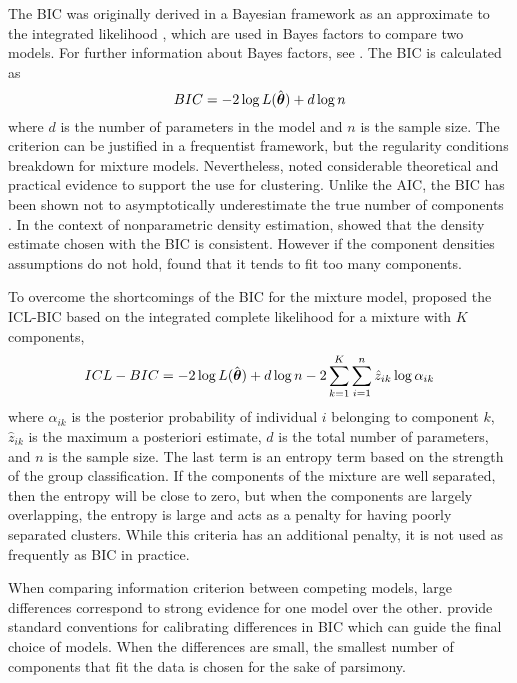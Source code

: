 The BIC was originally derived in a Bayesian framework as an approximate to the integrated likelihood  \cite{schwarz1978}, which are used in Bayes factors to compare two models. For further information about Bayes factors, see \textcite{kass1995}. The BIC is calculated as
$$BIC= -2 \log L(\hat{\boldsymbol\theta}) + d\log n $$
where $d$ is the number of parameters in the model and $n$ is the sample size. The criterion can be justified in a frequentist framework, but the regularity conditions breakdown for mixture models. Nevertheless, \textcite{fraley1998} noted considerable theoretical and practical evidence to support the use for clustering. Unlike the AIC, the BIC has been shown not to asymptotically underestimate the true number of components \cite{leroux1992}. In the context of nonparametric density estimation,  \textcite{roeder1997} showed that the density estimate chosen with the BIC is consistent. However if the component densities assumptions do not hold, \textcite{biernacki2000} found that it tends to fit too many components. 

To overcome the shortcomings of the BIC for the mixture model, \textcite{biernacki2000} proposed the ICL-BIC based on the integrated complete likelihood for a mixture with $K$ components,
$$ICL-BIC = -2\log L(\hat{\boldsymbol\theta}) + d\log n - 2\sum^{K}_{k=1}\sum^{n}_{i=1}\hat{z}_{ik}\log \alpha_{ik}$$
where $\alpha_{ik}$ is the posterior probability of individual $i$ belonging to component $k$, $\hat{z}_{ik}$ is the maximum a posteriori estimate, $d$ is the total number of parameters, and $n$ is the sample size. The last term is an entropy term based on the strength of the group classification. If the components of the mixture are well separated, then the entropy will be close to zero, but when the components are largely overlapping, the entropy is large and acts as a penalty for having poorly separated clusters. While this criteria has an additional penalty, it is not used as frequently as BIC in practice.

When comparing information criterion between competing models, large differences correspond to strong evidence for one model over the other. \textcite{kass1995} provide standard conventions for calibrating differences in BIC which can guide the final choice of models. When the differences are small, the smallest number of components that fit the data is chosen for the sake of parsimony.

